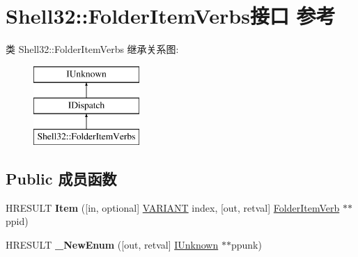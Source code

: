 \hypertarget{interface_shell32_1_1_folder_item_verbs}{}\section{Shell32\+:\+:Folder\+Item\+Verbs接口 参考}
\label{interface_shell32_1_1_folder_item_verbs}
类 Shell32\+:\+:Folder\+Item\+Verbs 继承关系图\+:\begin{figure}[H]
\begin{center}
\leavevmode
\includegraphics[height=3.000000cm]{interface_shell32_1_1_folder_item_verbs}
\end{center}
\end{figure}
\subsection*{Public 成员函数}
\begin{DoxyCompactItemize}
\item 
\mbox{\label{interface_shell32_1_1_folder_item_verbs_acbb5f272a3cbed8098984330afc278e5}} 
H\+R\+E\+S\+U\+LT {\bfseries Item} (\mbox{[}in, optional\mbox{]} \hyperlink{structtag_v_a_r_i_a_n_t}{V\+A\+R\+I\+A\+NT} index, \mbox{[}out, retval\mbox{]} \hyperlink{interface_shell32_1_1_folder_item_verb}{Folder\+Item\+Verb} $\ast$$\ast$ppid)
\item 
\mbox{\label{interface_shell32_1_1_folder_item_verbs_ae3ae8a95e5ecbc0a58bfad67d7f2c150}} 
H\+R\+E\+S\+U\+LT {\bfseries \+\_\+\+New\+Enum} (\mbox{[}out, retval\mbox{]} \hyperlink{interface_i_unknown}{I\+Unknown} $\ast$$\ast$ppunk)
\end{DoxyCompactItemize}
